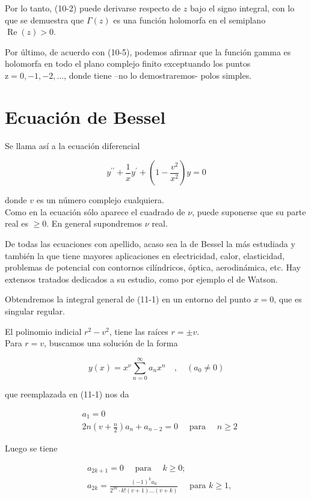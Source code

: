 \documentclass[10pt]{article}
\theoremstyle{plain}
\theoremstyle{definition}
\theoremstyle{remark}
\begin{document}
Por lo tanto, (10-2) puede derivarse respecto de $z$ bajo el signo integral, con lo que se demuestra que $\Gamma(z)$ es una función holomorfa en el semiplano $\operatorname{Re}(z)>0$.

Por último, de acuerdo con (10-5), podemos afirmar que la función gamma es holomorfa en todo el plano complejo finito exceptuando los puntos $\mathrm{z}=0,-1,-2, \ldots$, donde tiene --no lo demostraremos- polos simples.

\section{Ecuación de Bessel}
Se llama así a la ecuación diferencial


\begin{equation*}
y^{\prime \prime}+\frac{1}{x} y^{\prime}+\left(1-\frac{v^{2}}{x^{2}}\right) y=0 \tag{11-1}
\end{equation*}


donde $v$ es un número complejo cualquiera.\\
Como en la ecuación sólo aparece el cuadrado de $\nu$, puede suponerse que su parte real es $\geqslant 0$. En general supondremos $\nu$ real.

De todas las ecuaciones con apellido, acaso sea la de Bessel la más estudiada y también la que tiene mayores aplicaciones en electricidad, calor, elasticidad, problemas de potencial con contornos cilíndricos, óptica, aerodinámica, etc. Hay extensos tratados dedicados a su estudio, como por ejemplo el de Watson.

Obtendremos la integral general de (11-1) en un entorno del punto $x=0$, que es singular regular.

El polinomio indicial $r^{2}-v^{2}$, tiene las raíces $r= \pm v$.\\
Para $r=v$, buscamos una solución de la forma

$$
y(x)=x^{\nu} \sum_{n=0}^{\infty} a_{n} x^{n} \quad, \quad\left(a_{0} \neq 0\right)
$$

que reemplazada en (11-1) nos da


\begin{align*}
& a_{1}=0 \\
& 2 n\left(v+\frac{n}{2}\right) a_{n}+a_{n-2}=0 \quad \text { para } \quad n \geqslant 2 \tag{11-2}
\end{align*}


Luego se tiene

$$
\begin{aligned}
& a_{2 k+1}=0 \quad \text { para } \quad k \geqslant 0 ; \\
& a_{2 k}=\frac{(-1)^{k} a_{0}}{2^{2 k} \cdot k!(v+1) \ldots(v+k)} \quad \text { para } k \geqslant 1,
\end{aligned}
$$
\end{document}
